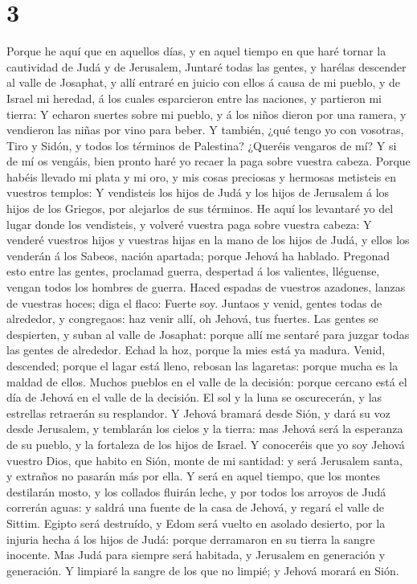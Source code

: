 \hypertarget{section-2}{%
\section{3}\label{section-2}}

 Porque he aquí que en aquellos días, y en aquel tiempo en
que haré tornar la cautividad de Judá y de Jerusalem, 
Juntaré todas las gentes, y harélas descender al valle de Josaphat, y
allí entraré en juicio con ellos á causa de mi pueblo, y de Israel mi
heredad, á los cuales esparcieron entre las naciones, y partieron mi
tierra:  Y echaron suertes sobre mi pueblo, y á los niños
dieron por una ramera, y vendieron las niñas por vino para beber.
 Y también, ¿qué tengo yo con vosotras, Tiro y Sidón, y
todos los términos de Palestina? ¿Queréis vengaros de mí? Y si de mí os
vengáis, bien pronto haré yo recaer la paga sobre vuestra cabeza.
 Porque habéis llevado mi plata y mi oro, y mis cosas
preciosas y hermosas metisteis en vuestros templos:  Y
vendisteis los hijos de Judá y los hijos de Jerusalem á los hijos de los
Griegos, por alejarlos de sus términos.  He aquí los
levantaré yo del lugar donde los vendisteis, y volveré vuestra paga
sobre vuestra cabeza:  Y venderé vuestros hijos y vuestras
hijas en la mano de los hijos de Judá, y ellos los venderán á los
Sabeos, nación apartada; porque Jehová ha hablado. 
Pregonad esto entre las gentes, proclamad guerra, despertad á los
valientes, lléguense, vengan todos los hombres de guerra.
 Haced espadas de vuestros azadones, lanzas de vuestras
hoces; diga el flaco: Fuerte soy.  Juntaos y venid,
gentes todas de alrededor, y congregaos: haz venir allí, oh Jehová, tus
fuertes.  Las gentes se despierten, y suban al valle de
Josaphat: porque allí me sentaré para juzgar todas las gentes de
alrededor.  Echad la hoz, porque la mies está ya madura.
Venid, descended; porque el lagar está lleno, rebosan las lagaretas:
porque mucha es la maldad de ellos.  Muchos pueblos en el
valle de la decisión: porque cercano está el día de Jehová en el valle
de la decisión.  El sol y la luna se oscurecerán, y las
estrellas retraerán su resplandor.  Y Jehová bramará
desde Sión, y dará su voz desde Jerusalem, y temblarán los cielos y la
tierra: mas Jehová será la esperanza de su pueblo, y la fortaleza de los
hijos de Israel.  Y conoceréis que yo soy Jehová vuestro
Dios, que habito en Sión, monte de mi santidad: y será Jerusalem santa,
y extraños no pasarán más por ella.  Y será en aquel
tiempo, que los montes destilarán mosto, y los collados fluirán leche, y
por todos los arroyos de Judá correrán aguas: y saldrá una fuente de la
casa de Jehová, y regará el valle de Sittim.  Egipto será
destruído, y Edom será vuelto en asolado desierto, por la injuria hecha
á los hijos de Judá: porque derramaron en su tierra la sangre inocente.
 Mas Judá para siempre será habitada, y Jerusalem en
generación y generación.  Y limpiaré la sangre de los que
no limpié; y Jehová morará en Sión.
